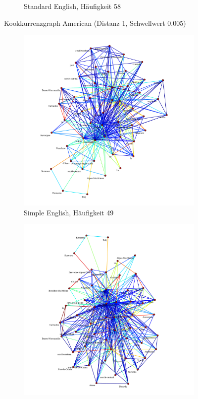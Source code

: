 \documentclass[11pt, a4paper]{article}
\begin{document}
\begin{figure}[hp!]
\begin{subfigure}[b]{0.5\textwidth}
        \caption{Standard English, Häufigkeit 58}
    \end{subfigure}
    \caption{Kookkurrenzgraph American (Distanz 1, Schwellwert 0,005)}
    \label{fig:hw-american}
\end{figure}

\begin{figure}[hp!]
    \centering
    \begin{subfigure}[b]{0.5\textwidth}
        \includegraphics[scale=.25]{../../data/results/cooc_wiki_sim/topwords-t0005/graph_commune.pdf}
        \caption{Simple English, Häufigkeit 49}
    \end{subfigure}
    \begin{subfigure}[b]{0.5\textwidth}
        \includegraphics[scale=.25]{../../data/results/cooc_wiki_en/topwords-t0005/graph_commune.pdf}

\end{subfigure}
\end{figure}
\end{document}
